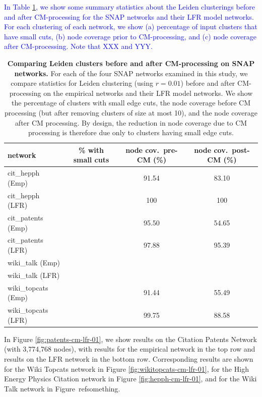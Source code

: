 \documentclass[11pt]{article}   	%
\begin{document}
\textcolor{blue}{In Table \ref{tab:LFR-vs-empirical-SNAP}, we show some summary statistics about the  Leiden clusterings before and after CM-processing for the SNAP networks and their LFR model networks.  For each clustering of each network, we  show (a) percentage of input clusters that have small cuts, (b) node coverage prior to CM-processing, and (c) node coverage after CM-processing.  Note that
XXX and YYY.}


\begin{table}[ht]
\centering
\begin{tabular}{lccc}
  \hline
 network & \% with small cuts & node cov.~pre-CM (\%) & node cov.~post-CM (\%) \\
  \hline
  cit\_hepph (Emp) &  & 91.54 & 83.10 \\
  cit\_hepph (LFR) &  & 100 & 100 \\
  \hline
  cit\_patents (Emp) & & 95.50 & 54.65\\
    cit\_patents  (LFR) & & 97.88 & 95.39\\
  \hline
  wiki\_talk (Emp) & & & \\
    wiki\_talk (LFR) & & & \\
  \hline
  wiki\_topcats  (Emp)& & 91.44 & 55.49 \\
   wiki\_topcats  (LFR)& & 99.75 & 88.58 \\
   \hline
\end{tabular}
\caption{\textbf{Comparing Leiden clusters before and after CM-processing  on SNAP networks.} For each of the four SNAP networks
examined in this study, we compare statistics for Leiden clustering (using $r=0.01$) before and after CM-processing on the empirical networks and their LFR model
networks. We show the percentage of clusters with small edge cuts, the node coverage before CM processing (but after removing clusters of size at most 10), and the node coverage
after CM processing.  By design, the reduction in node coverage due to CM processing  is therefore due only to clusters having small edge cuts.}
\label{tab:LFR-vs-empirical-SNAP}
\end{table}



In Figure \ref{fig:patents-cm-lfr-01}, we show results on the Citation Patents Network  (with 3,774,768 nodes), with results for the
empirical  network in the top row and results on the LFR network in the bottom row.
Corresponding results are shown for the Wiki Topcats network in Figure \ref{fig:wikitopcats-cm-lfr-01}, for the High Energy Physics Citation network
in Figure \ref{fig:hepph-cm-lfr-01}, and for the Wiki Talk network in Figure\ ref{something}.
\end{document}
